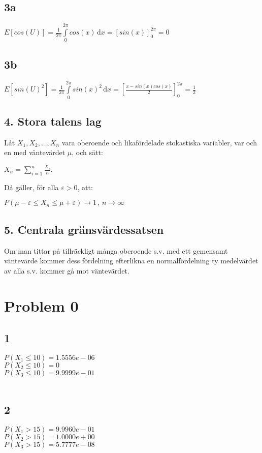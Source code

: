 \documentclass{article}
\begin{document}
\subsection*{3a}
$
E[cos(U)] =
\frac{1}{2\pi} \int \limits_0^{2\pi} cos(x) \, \mathrm{d}x =
\left[sin(x)\right]_0^{2\pi} =
0
$

\subsection*{3b}

$
E[sin(U)^2] =
\frac{1}{2\pi} \int \limits_0^{2\pi} sin(x)^2 \, \mathrm{d}x =
\left[\frac{x-sin(x)cos(x)}{2}\right]_0^{2\pi} =
\frac{1}{2}
$

\subsection*{4. Stora talens lag}

Låt $ X_1, X_2, ..., X_n $ vara oberoende och likafördelade stokastiska
variabler, var och en med väntevärdet $\mu$, och sätt:

$
X_n = \sum\limits_{i=1}^{n}\frac{X_i}{n}.
$

Då gäller, för alla $\varepsilon > 0$, att:

$
P(\mu - \varepsilon \le X_n \le \mu + \varepsilon) \to 1 \, , \, n \to \infty
$
\subsection*{5. Centrala gränsvärdessatsen}

Om man tittar på tillräckligt många oberoende s.v. med ett gemensamt väntevärde
kommer dess fördelning efterlikna en normalfördelning ty medelvärdet av alla
s.v. kommer gå mot väntevärdet.

\section*{Problem 0}
\subsection*{1}
   
  $ P(X_1 \le 10) = 1.5556e-06 $      \\       
  $ P(X_2 \le 10) = 0 $               \\
  $ P(X_3 \le 10) = 9.9999e-01 $\\
  \\
\subsection*{2}
  $ P(X_1 > 15) = 9.9960e-01 $\\
  $ P(X_2 > 15) = 1.0000e+00 $\\
  $ P(X_3 > 15) = 5.7777e-08 $\\
  \\
\end{document}
